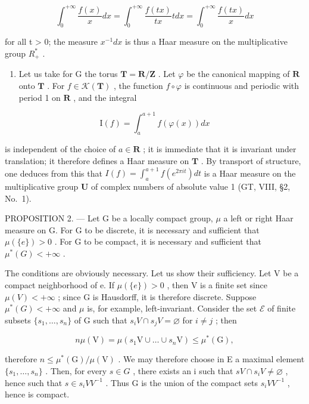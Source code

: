 \[
\int_ {0} ^ {+ \infty} \frac {f (x)}{x} d x = \int_ {0} ^ {+ \infty} \frac {f (t x)}{t x} t d x = \int_ {0} ^ {+ \infty} \frac {f (t x)}{x} d x
\]

for all t \textgreater{} 0; the measure \(x^{-1} dx\) is thus a Haar measure on the multiplicative group \(R_{+}^{*}\) .

\begin{enumerate}
\def\labelenumi{\arabic{enumi})}
\setcounter{enumi}{2}
\tightlist
\item
  Let us take for G the torus \(\mathbf{T} = \mathbf{R} / \mathbf{Z}\) . Let \(\varphi\) be the canonical mapping of \(\mathbf{R}\) onto \(\mathbf{T}\) . For \(f \in \mathcal{K}(\mathbf{T})\) , the function \(f \circ \varphi\) is continuous and periodic with period 1 on \(\mathbf{R}\) , and the integral
\end{enumerate}

\[
\mathrm{I} (f) = \int_ {a} ^ {a + 1} f (\varphi (x)) d x
\]

is independent of the choice of \(a \in \mathbf{R}\) ; it is immediate that it is invariant under translation; it therefore defines a Haar measure on \(\mathbf{T}\) . By transport of structure, one deduces from this that \(I(f) = \int_{a}^{a + 1} f(e^{2\pi it}) dt\) is a Haar measure on the multiplicative group \(\mathbf{U}\) of complex numbers of absolute value 1 (GT, VIII, §2, No.~1).

PROPOSITION 2. --- Let G be a locally compact group, \(\mu\) a left or right Haar measure on G. For G to be discrete, it is necessary and sufficient that \(\mu(\{e\}) > 0\) . For G to be compact, it is necessary and sufficient that \(\mu^{*}(G) < +\infty\) .

The conditions are obviously necessary. Let us show their sufficiency. Let V be a compact neighborhood of e. If \(\mu(\{e\}) > 0\) , then V is a finite set since \(\mu(V) < +\infty\) ; since G is Hausdorff, it is therefore discrete. Suppose \(\mu^{*}(G)<+\infty\) and \(\mu\) is, for example, left-invariant. Consider the set \(\mathscr{E}\) of finite subsets \(\{s_{1},\ldots,s_{n}\}\) of G such that \(s_{i}V\cap s_{j}V=\varnothing\) for \(i\neq j\) ; then

\[
n \mu (\mathrm{V}) = \mu (s _ {1} \mathrm{V} \cup \dots \cup s _ {n} \mathrm{V}) \leqslant \mu^ {*} (\mathrm{G}),
\]

therefore \(n \leqslant \mu^{*}(\mathrm{G})/\mu(\mathrm{V})\) . We may therefore choose in E a maximal element \(\{s_{1},\ldots,s_{n}\}\) . Then, for every \(s \in G\) , there exists an i such that \(sV \cap s_{i}V \neq \varnothing\) , hence such that \(s \in s_{i}VV^{-1}\) . Thus G is the union of the compact sets \(s_{i}VV^{-1}\) , hence is compact.

